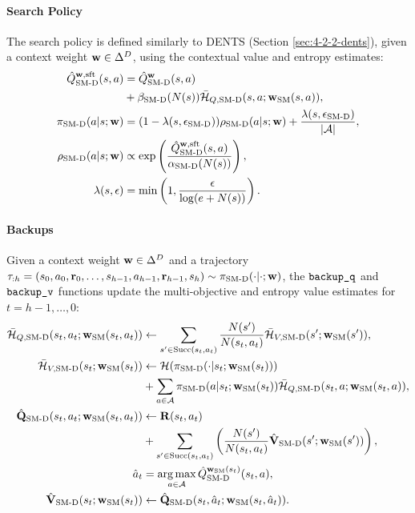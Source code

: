     
    \paragraph{Search Policy}

    The search policy is defined similarly to DENTS (Section \ref{sec:4-2-2-dents}), given a context weight $\bff{w}\in\Delta^D$, using the contextual value and entropy estimates:
    \begin{align}
        \Qsmdsoft(s,a) &= \Qsmdctx(s,a) \nonumber \\
            &+\betasmd(N(s))\HQsmd(s,a;\wSMat{s,a}), \\
        \pismd(a|s;\bff{w}) &= (1-\lambdasmd)\rhosmd(a|s;\bff{w}) + \frac{\lambdasmd}{|\cl{A}|}, 
                    \label{eq:sm_dents_search_policy} \\ 
        \rhosmd(a|s;\bff{w}) &\propto \exp\left(\frac{\Qsmdsoft(s,a)}{\alphasmd(N(s))}\right),
                    \label{eq:sm_dents_value_policy} \\
        \lambda(s,\epsilon) &= \min\left(1, \frac{\epsilon}{\log(e+N(s))}\right).
    \end{align}




    \paragraph{Backups}

    Given a context weight $\bff{w}\in\Delta^D$ and a trajectory $\splitatcommas{\tau_{:h}=(s_0,a_0,\bff{r}_0,\ldots,s_{h-1},a_{h-1},\bff{r}_{h-1},s_h)\sim\pismd(\cdot|\cdot;\bff{w})}$, the $\backupq$ and $\backupv$ functions update the multi-objective and entropy value estimates for $t=h-1,\ldots,0$:
    \begin{align}
        \HQsmd(s_t,a_t;\wSMat{s_t,a_t}) &\leftarrow \sum_{s'\in \suc{s_t}{a_t}} \frac{N(s')}{N(s_t,a_t)} \HVsmd(s';\wSMat{s'}),
            \label{eq:6:smdents_entropy_q_backup} \\
        \HVsmd(s_t;\wSMat{s_t}) &\leftarrow \cl{H}(\pismd(\cdot | s_t;\wSMat{s_t})) \nonumber \\
            &+ \sum_{a\in\cl{A}} \pismd(a|s_t;\wSMat{s_t})\HQsmd(s_t,a;\wSMat{s_t,a}),
            \label{eq:6:smdents_entropy_v_backup}  \\
        \Qsmd(s_t,a_t;\wSMat{s_t,a_t}) &\leftarrow
            \bff{R}(s_t,a_t) \nonumber \\
            &+ \sum_{s' \in \suc{s_t}{a_t}} \left( \frac{N(s')}{N(s_t,a_t)} \Vsmd(s';\wSMat{s'}) \right),
                    \label{eq:6:smdents_q_backup} \\
        \hat{a}_t &= \argmax_{a\in\cl{A}} \Qsmdctxcstm{\wSMat{s_t}}(s_t,a),
                    \label{eq:6:smdents_greedy_action} \\
        \Vsmd(s_t;\wSMat{s_t}) &\leftarrow  \Qsmd(s_t,\hat{a}_t;\wSMat{s_t,\hat{a}_t}).
                    \label{eq:6:smdents_backup_v}
    \end{align}

